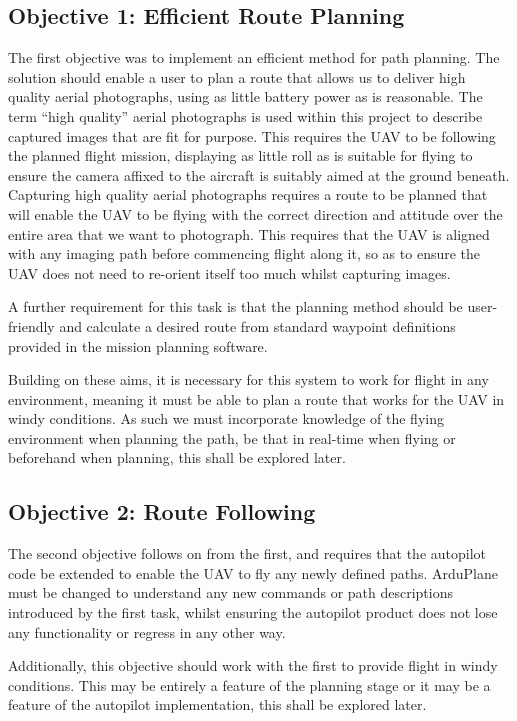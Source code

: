 \subsection{Objective 1: Efficient Route Planning}
\label{intro:obj1}
The first objective was to implement an efficient method for path planning. The solution should enable a user to plan a route that allows us to deliver high quality aerial photographs, using as little battery power as is reasonable. The term ``high quality'' aerial photographs is used within this project to describe captured images that are fit for purpose. This requires the UAV to be following the planned flight mission, displaying as little roll as is suitable for flying to ensure the camera affixed to the aircraft is suitably aimed at the ground beneath. Capturing high quality aerial photographs requires a route to be planned that will enable the UAV to be flying with the correct direction and attitude over the entire area that we want to photograph. This requires that the UAV is aligned with any imaging path before commencing flight along it, so as to ensure the UAV does not need to re-orient itself too much whilst capturing images.

A further requirement for this task is that the planning method should be user-friendly and calculate a desired route from standard waypoint definitions provided in the mission planning software.

Building on these aims, it is necessary for this system to work for flight in any environment, meaning it must be able to plan a route that works for the UAV in windy conditions. As such we must incorporate knowledge of the flying environment when planning the path, be that in real-time when flying or beforehand when planning, this shall be explored later.

\subsection{Objective 2: Route Following}
\label{intro:obj2}

The second objective follows on from the first, and requires that the autopilot code be extended to enable the UAV to fly any newly defined paths. ArduPlane must be changed to understand any new commands or path descriptions introduced by the first task, whilst ensuring the autopilot product does not lose any functionality or regress in any other way.

Additionally, this objective should work with the first to provide flight in windy conditions. This may be entirely a feature of the planning stage or it may be a feature of the autopilot implementation, this shall be explored later.

